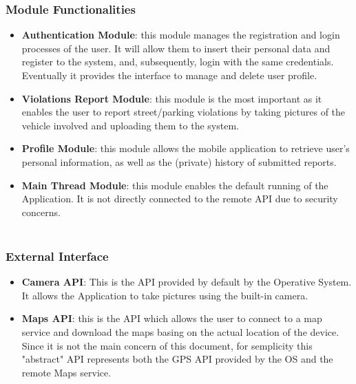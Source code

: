 \documentclass[12pt,a4paper]{article}
\begin{document}
\subsubsection*{Module Functionalities}
\begin{itemize}
\item \textbf{Authentication Module}: this module manages the registration and login processes of the user. It will allow them to insert their personal data and register to the system, and, subsequently, login with the same credentials. Eventually it provides the interface to manage and delete user profile.
\item \textbf{Violations Report Module}: this module is the most important as it enables the user to report street/parking violations by taking pictures of the vehicle involved and uploading them to the system. 
\item \textbf{Profile Module}: this module allows the mobile application to retrieve user's personal information, as well as the (private) history of submitted reports.
\item \textbf{Main Thread Module}: this module enables the default running of the Application. It is not directly connected to the remote API due to security concerns.\\\\
\end{itemize}
\subsubsection*{External Interface}
\begin{itemize}
\item \textbf{Camera API}: This is the API provided by default by the Operative System. It allows the Application to take pictures using the built-in camera.
\item \textbf{Maps API}: this is the API which allows the user to connect to a map service and download the maps basing on the actual location of the device. Since it is not the main concern of this document, for semplicity this "abstract" API represents both the GPS API provided by the OS and the remote Maps service.
\end{itemize}
\newpage
\end{document}
